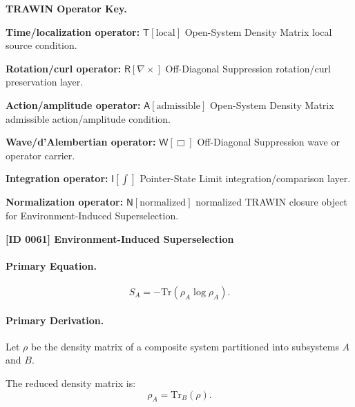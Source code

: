 \par\vspace{0.45\baselineskip}
\noindent\begin{minipage}[t]{\linewidth}
\begingroup
\small
\raggedright
\textbf{TRAWIN Operator Key.}\par
\noindent\textbf{Time/localization operator:} $\mathsf{T}\!\left[\mathrm{local}\right]$ Open-System Density Matrix local source condition.\par
\noindent\textbf{Rotation/curl operator:} $\mathsf{R}\!\left[\nabla\times\right]$ Off-Diagonal Suppression rotation/curl preservation layer.\par
\noindent\textbf{Action/amplitude operator:} $\mathsf{A}\!\left[\mathrm{admissible}\right]$ Open-System Density Matrix admissible action/amplitude condition.\par
\noindent\textbf{Wave/d'Alembertian operator:} $\mathsf{W}\!\left[\Box\right]$ Off-Diagonal Suppression wave or operator carrier.\par
\noindent\textbf{Integration operator:} $\mathsf{I}\!\left[\int\right]$ Pointer-State Limit integration/comparison layer.\par
\noindent\textbf{Normalization operator:} $\mathsf{N}\!\left[\mathrm{normalized}\right]$ normalized TRAWIN closure object for Environment-Induced Superselection.\par
\endgroup
\end{minipage}

\clearpage
\noindent\textbf{[ID 0061] Environment-Induced Superselection}\par
\vspace{0.35em}
\paragraph{Primary Equation.}
\begin{equation}
S_A = -\mathrm{Tr}(\rho_A \log \rho_A).
\end{equation}

\paragraph{Primary Derivation.}
Let $\rho$ be the density matrix of a composite system partitioned into subsystems $A$ and $B$.

The reduced density matrix is:
\begin{equation}
\rho_A = \mathrm{Tr}_B(\rho).
\end{equation}

